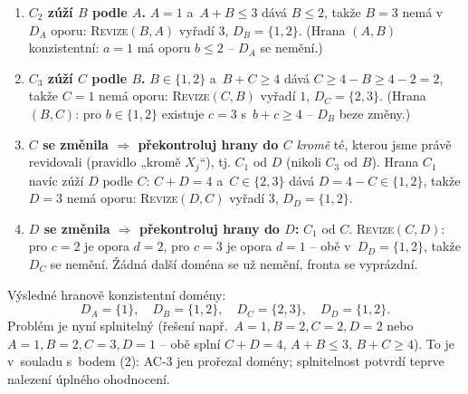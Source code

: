 \begin{priklad}
\begin{enumerate}
  \item \textbf{$C_2$ zúží $B$ podle $A$.} $A=1$ a~$A+B\le3$ dává $B\le2$, takže $B=3$ nemá v~$D_A$ oporu: \textsc{Revize}$(B,A)$ vyřadí $3$, $\boxed{D_B=\{1,2\}}$. (Hrana $(A,B)$ konzistentní: $a=1$ má oporu $b\le2$ -- $D_A$ se nemění.)
  \item \textbf{$C_3$ zúží $C$ podle $B$.} $B\in\{1,2\}$ a~$B+C\ge4$ dává $C\ge4-B\ge4-2=2$, takže $C=1$ nemá oporu: \textsc{Revize}$(C,B)$ vyřadí $1$, $\boxed{D_C=\{2,3\}}$. (Hrana $(B,C)$: pro $b\in\{1,2\}$ existuje $c=3$ s~$b+c\ge4$ -- $D_B$ beze změny.)
  \item \textbf{$C$ se změnila $\Rightarrow$ překontroluj hrany do $C$} \emph{kromě} té, kterou jsme právě revidovali (pravidlo „kromě $X_j$``), tj. $C_1$ od $D$ (nikoli $C_3$ od $B$). Hrana $C_1$ navíc zúží $D$ podle $C$: $C+D=4$ a~$C\in\{2,3\}$ dává $D=4-C\in\{1,2\}$, takže $D=3$ nemá oporu: \textsc{Revize}$(D,C)$ vyřadí $3$, $\boxed{D_D=\{1,2\}}$.
  \item \textbf{$D$ se změnila $\Rightarrow$ překontroluj hrany do $D$:} $C_1$ od $C$. \textsc{Revize}$(C,D)$: pro $c=2$ je opora $d=2$, pro $c=3$ je opora $d=1$ -- obě v~$D_D=\{1,2\}$, takže $D_C$ se nemění. Žádná další doména se už nemění, fronta se vyprázdní.
\end{enumerate}

\noindent Výsledné hranově konzistentní domény:
\[ \boxed{D_A=\{1\},\quad D_B=\{1,2\},\quad D_C=\{2,3\},\quad D_D=\{1,2\}.} \]
Problém je nyní splnitelný (řešení např.\ $A{=}1,B{=}2,C{=}2,D{=}2$ nebo $A{=}1,B{=}2,C{=}3,D{=}1$ -- obě splní $C+D=4$, $A+B\le3$, $B+C\ge4$). To je v~souladu s~bodem (2): AC-3 jen prořezal domény; splnitelnost potvrdí teprve nalezení úplného ohodnocení.

\begin{center}
\end{center}
\end{priklad}

